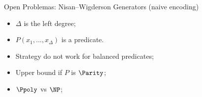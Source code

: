 \begin{frame}{Open Problemas: Nisan--Wigderson Generators (naive encoding)}

    \begin{minipage}{0.48\linewidth}
        \centering
        
    \end{minipage}
    \begin{minipage}{0.48\linewidth}
        \begin{itemize}
            \item $\Delta$ is the left degree;
            \item $P(x_1, \dots, x_{\Delta})$ is a predicate.
        \end{itemize}
        
        \vspace{0.2cm}
        \pause
        \begin{itemize}
            \item Strategy do not work for balanced predicates;
            \item Upper bound if $P$ is $\Parity$;
            \item $\Ppoly$ vs $\NP$;
        \end{itemize}
    \end{minipage}
\end{frame}

